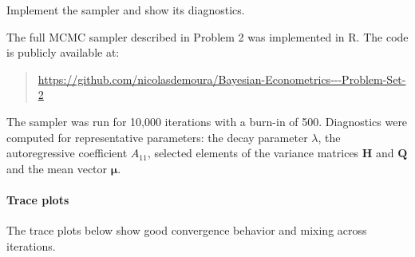 Implement the sampler and show its diagnostics.

The full MCMC sampler described in Problem 2 was implemented in R. The code is publicly available at:

\begin{quote}
\url{https://github.com/nicolasdemoura/Bayesian-Econometrics---Problem-Set-2}
\end{quote}

The sampler was run for 10,000 iterations with a burn-in of 500. Diagnostics were computed for representative parameters: the decay parameter $\lambda$, the autoregressive coefficient $A_{11}$, selected elements of the variance matrices $\mathbf{H}$ and $\mathbf{Q}$ and the mean vector $\boldsymbol{\mu}$.

\paragraph{Trace plots}
The trace plots below show good convergence behavior and mixing across iterations.

